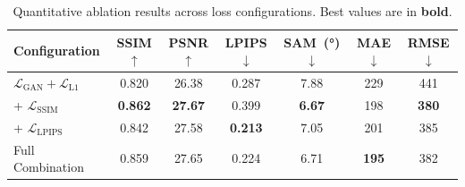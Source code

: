 \documentclass[remotesensing,article,submit,pdftex,moreauthors]{Definitions/mdpi}
\begin{document}
\begin{table}[!htbp]
    \centering
    \caption{Quantitative ablation results across loss configurations. Best values are in \textbf{bold}.}
    \label{tab:ablation_quantitative}
        \begin{tabular}{lcccccc}
            \toprule
            \textbf{Configuration} & \textbf{SSIM $\uparrow$} & \textbf{PSNR $\uparrow$} & \textbf{LPIPS $\downarrow$} & \textbf{SAM~(°) $\downarrow$} & \textbf{MAE $\downarrow$} & \textbf{RMSE $\downarrow$} \\
            \midrule
            $\mathcal{L}_{\text{GAN}} + \mathcal{L}_{\text{L1}}$ & 0.820 & 26.38 & 0.287 & 7.88 & 229 & 441 \\
            + $\mathcal{L}_{\text{SSIM}}$ & \textbf{0.862} & \textbf{27.67} & 0.399 & \textbf{6.67} & 198 & \textbf{380} \\
            + $\mathcal{L}_{\text{LPIPS}}$ & 0.842 & 27.58 & \textbf{0.213} & 7.05 & 201 & 385 \\
            Full Combination & 0.859 & 27.65 & 0.224 & 6.71 & \textbf{195} & 382 \\
            \bottomrule
        \end{tabular}%
\end{table}
\end{document}
